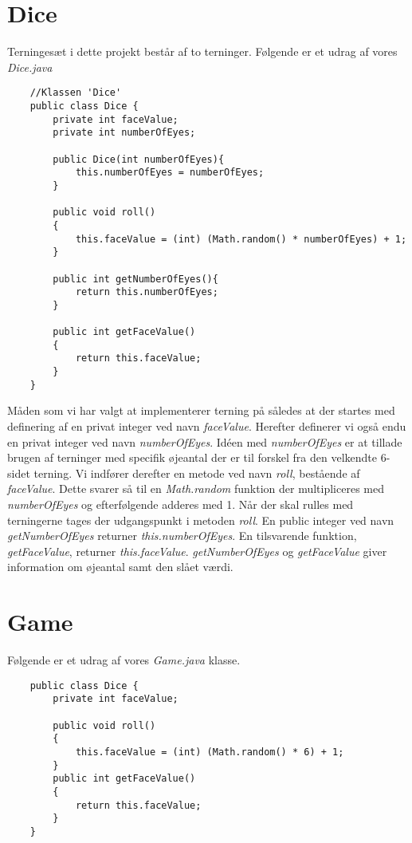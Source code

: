 \section{Dice}
\noindent Terningesæt i dette projekt består af to terninger. 
Følgende er et udrag af vores \textit{Dice.java}\\
\begin{lstlisting}
    //Klassen 'Dice'    
    public class Dice {
        private int faceValue;
        private int numberOfEyes;

        public Dice(int numberOfEyes){
            this.numberOfEyes = numberOfEyes;
        }

        public void roll()
        {
            this.faceValue = (int) (Math.random() * numberOfEyes) + 1;
        }

        public int getNumberOfEyes(){
            return this.numberOfEyes;
        }

        public int getFaceValue()
        {
            return this.faceValue;
        }
    }
\end{lstlisting}
\vspace{2ex}

\noindent Måden som vi har valgt at implementerer terning på således at der startes med definering af en privat integer ved navn \textit{faceValue}.
Herefter definerer vi også endu en privat integer ved navn \textit{numberOfEyes}.
Idéen med \textit{numberOfEyes} er at tillade brugen af terninger med specifik øjeantal der er til forskel fra den velkendte 6-sidet terning.
Vi indfører derefter en metode ved navn \textit{roll}, bestående af \textit{faceValue}.
Dette svarer så til en \textit{Math.random} funktion der multipliceres med \textit{numberOfEyes} og efterfølgende adderes med 1.
Når der skal rulles med terningerne tages der udgangspunkt i metoden \textit{roll}.
En public integer ved navn \textit{getNumberOfEyes} returner \textit{this.numberOfEyes}.
En tilsvarende funktion, \textit{getFaceValue}, returner \textit{this.faceValue}.
\textit{getNumberOfEyes} og \textit{getFaceValue} giver information om øjeantal samt den slået værdi.\\

\section{Game}
\noindent Følgende er et udrag af vores \textit{Game.java} klasse.\\
\begin{lstlisting}
    public class Dice {
        private int faceValue;

        public void roll()
        {
            this.faceValue = (int) (Math.random() * 6) + 1;
        }
        public int getFaceValue()
        {
            return this.faceValue;
        }
    }
\end{lstlisting}
\vspace{2ex}

